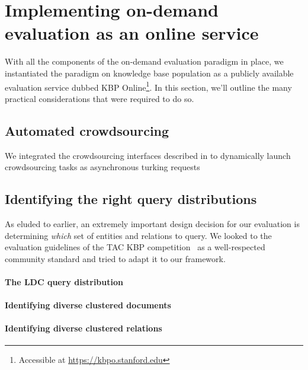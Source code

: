 \section{\label{sec:kbpo:kbpo} Implementing on-demand evaluation as an online service}

With all the components of the on-demand evaluation paradigm in place, we instantiated the paradigm on knowledge base population as a publicly available evaluation service dubbed KBP Online\footnote{Accessible at \url{https://kbpo.stanford.edu}}.
In this section, we'll outline the many practical considerations that were required to do so.

\subsection{Automated crowdsourcing}
We integrated the crowdsourcing interfaces described in  to dynamically launch crowdsourcing tasks as 
asynchronous turking requests

\subsection{Identifying the right query distributions}
As eluded to earlier, an extremely important design decision for our evaluation is determining \textit{which} set of entities and relations to query.
We looked to the evaluation guidelines of the TAC KBP competition~\citep{ellis2015overview,?} as a well-respected community standard and tried to adapt it to our framework.

\paragraph{The LDC query distribution}

\paragraph{Identifying diverse clustered documents}

\paragraph{Identifying diverse clustered relations}

